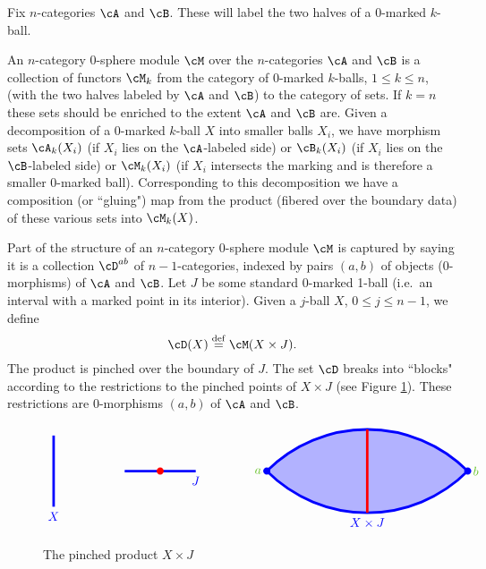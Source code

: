 Fix $n$-categories $\cA$ and $\cB$.
These will label the two halves of a $0$-marked $k$-ball.

An $n$-category $0$-sphere module $\cM$ over the $n$-categories $\cA$ and $\cB$ is a collection of functors $\cM_k$ from the category
of $0$-marked $k$-balls, $1\le k \le n$,
(with the two halves labeled by $\cA$ and $\cB$) to the category of sets.
If $k=n$ these sets should be enriched to the extent $\cA$ and $\cB$ are.
Given a decomposition of a $0$-marked $k$-ball $X$ into smaller balls $X_i$, we have
morphism sets $\cA_k(X_i)$ (if $X_i$ lies on the $\cA$-labeled side)
or $\cB_k(X_i)$ (if $X_i$ lies on the $\cB$-labeled side)
or $\cM_k(X_i)$ (if $X_i$ intersects the marking and is therefore a smaller 0-marked ball).
Corresponding to this decomposition we have a composition (or ``gluing") map
from the product (fibered over the boundary data) of these various sets into $\cM_k(X)$.

\medskip

Part of the structure of an $n$-category 0-sphere module $\cM$  is captured by saying it is
a collection $\cD^{ab}$ of $n{-}1$-categories, indexed by pairs $(a, b)$ of objects (0-morphisms)
of $\cA$ and $\cB$.
Let $J$ be some standard 0-marked 1-ball (i.e.\ an interval with a marked point in its interior).
Given a $j$-ball $X$, $0\le j\le n-1$, we define
\[
	\cD(X) \deq \cM(X\times J) .
\]
The product is pinched over the boundary of $J$.
The set $\cD$ breaks into ``blocks" according to the restrictions to the pinched points of $X\times J$
(see Figure \ref{feb21b}).
These restrictions are 0-morphisms $(a, b)$ of $\cA$ and $\cB$.

\begin{figure}[t]
$$
\begin{tikzpicture}[blue,line width=2pt]
\draw (0,1) -- (0,-1) node[below] {$X$};

\draw (2,0) -- (4,0) node[below] {$J$};
\fill[red] (3,0) circle (0.1);

\draw[fill=blue!30!white] (6,0) node(a) {} arc (135:90:4) node(top) {} arc (90:45:4) node(b) {} arc (-45:-90:4) node(bottom) {} arc(-90:-135:4);
\draw[red] (top.center) -- (bottom.center);
\fill (a) circle (0.1) node[left] {\color{green!50!brown} $a$};
\fill (b) circle (0.1) node[right] {\color{green!50!brown} $b$};

\path (bottom) node[below]{$X \times J$};

\end{tikzpicture}
$$
\caption{The pinched product $X\times J$}
\label{feb21b}
\end{figure}


